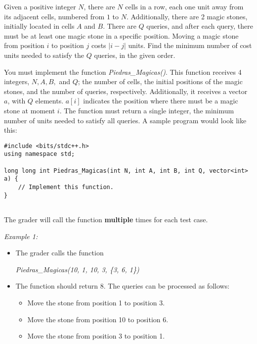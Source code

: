 \documentclass[12pt]{scrartcl}
\begin{document}

    
    \vspace{10pt}

    

        Given a positive integer $N$, there are $N$ cells in a row, each one unit away from its adjacent cells, numbered from $1$ to $N$. Additionally, there are 2 magic stones, initially located in cells $A$ and $B$. There are $Q$ queries, and after each query, there must be at least one magic stone in a specific position. Moving a magic stone from position $i$ to position $j$ costs $\lvert i - j \lvert$ units. Find the minimum number of cost units needed to satisfy the $Q$ queries, in the given order.
        

        You must implement the function \textit{Piedras\_Magicas()}. This function receives 4 integers, $N, A, B,$ and $Q$; the number of cells, the initial positions of the magic stones, and the number of queries, respectively. Additionally, it receives a vector $a$, with $Q$ elements. $a[i]$ indicates the position where there must be a magic stone at moment $i$. The function must return a single integer, the minimum number of units needed to satisfy all queries. 
        A sample program would look like this:

\begin{verbatim}
#include <bits/stdc++.h>
using namespace std;

long long int Piedras_Magicas(int N, int A, int B, int Q, vector<int> a) {
    // Implement this function.
}
    
\end{verbatim}

    The grader will call the function \textbf{multiple} times for each test case.
    
    
        {\itshape Example 1: }
        \begin{itemize}
            \item The grader calls the function 
            \begin{center}
                \textit{Piedras\_Magicas(10, 1, 10, 3, \{3, 6, 1\})}
            \end{center}
            
            \item The function should return $8$. The queries can be processed as follows:
            \begin{itemize}
                \item Move the stone from position 1 to position 3.
                \item Move the stone from position 10 to position 6.
                \item Move the stone from position 3 to position 1.
            \end{itemize}
        \end{itemize}
\end{document}
